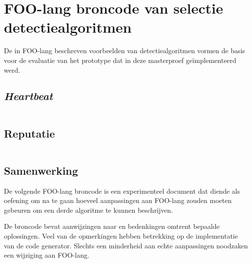 
\chapter{FOO-lang broncode van selectie detectiealgoritmen}
\label{appendix:demo-code}

De in FOO-lang beschreven voorbeelden van detectiealgoritmen vormen de basis
voor de evaluatie van het prototype dat in deze masterproef ge\"implementeerd
werd.

\section{\emph{Heartbeat}}
\label{section:demo-code-heartbeat}

\inputminted[linenos,frame=lines,framesep=2mm,fontsize=\footnotesize]{js}{../src/foo-lang/examples/heartbeat.foo}
\vspace{-5mm}

\section{Reputatie}
\label{section:demo-code-reputation}

\inputminted[linenos,frame=lines,framesep=2mm,fontsize=\footnotesize]{js}{../src/foo-lang/examples/reputation.foo}
\vspace{-5mm}

\section{Samenwerking}
\label{section:demo-code-cooperation}

De volgende FOO-lang broncode is een experimenteel document dat diende als
oefening om na te gaan hoeveel aanpassingen aan FOO-lang zouden moeten gebeuren
om een derde algoritme te kunnen beschrijven.

De broncode bevat aanwijzingen naar en bedenkingen omtrent bepaalde
oplossingen. Veel van de opmerkingen hebben betrekking op de implementatie van
de code generator. Slechts een minderheid aan echte aanpassingen noodzaken een
wijziging aan FOO-lang.

\inputminted[linenos,frame=lines,framesep=2mm,fontsize=\footnotesize]{js}{../src/foo-lang/examples/cooperation.foo}
\vspace{-5mm}
